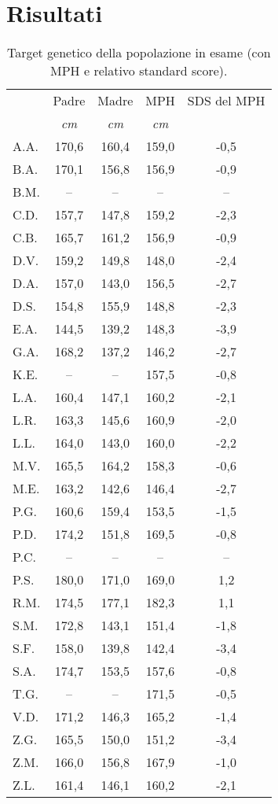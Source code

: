 \chapter{Risultati}

\begin{table}[!h]
\begin{center}
\addtolength{\tabcolsep}{12pt}
\renewcommand{\arraystretch}{1.1}
\begin{tabular}{lcccc}
\toprule

 & Padre & Madre & MPH & SDS del MPH \\
 & \emph{cm} & \emph{cm} & \emph{cm} & \\
\midrule
A.A.	& 170,6 & 160,4 & 159,0 & -0,5  \\
B.A.	& 170,1 & 156,8 & 156,9 & -0,9  \\
B.M.	& --    & --    & --    & --    \\
C.D.	& 157,7 & 147,8 & 159,2 & -2,3  \\
C.B.	& 165,7 & 161,2 & 156,9 & -0,9  \\
D.V.	& 159,2 & 149,8 & 148,0 & -2,4  \\
D.A.	& 157,0 & 143,0 & 156,5 & -2,7  \\
D.S.	& 154,8 & 155,9 & 148,8 & -2,3  \\
E.A.	& 144,5 & 139,2 & 148,3 & -3,9  \\
G.A.	& 168,2 & 137,2 & 146,2 & -2,7  \\
K.E.	&  --   &  --   & 157,5 & -0,8  \\            
L.A.	& 160,4 & 147,1 & 160,2 & -2,1  \\
L.R.	& 163,3 & 145,6 & 160,9 & -2,0  \\
L.L.	& 164,0 & 143,0 & 160,0 & -2,2  \\
M.V.	& 165,5 & 164,2 & 158,3 & -0,6  \\
M.E.	& 163,2 & 142,6 & 146,4 & -2,7  \\
P.G.	& 160,6 & 159,4 & 153,5 & -1,5  \\
P.D.	& 174,2 & 151,8 & 169,5 & -0,8  \\
P.C.	& --    & --    & --    & --    \\
P.S.	& 180,0 & 171,0 & 169,0 & 1,2   \\
R.M.	& 174,5 & 177,1 & 182,3 & 1,1   \\
S.M.	& 172,8 & 143,1 & 151,4 & -1,8  \\
S.F.	& 158,0 & 139,8 & 142,4 & -3,4  \\
S.A.	& 174,7 & 153,5 & 157,6 & -0,8  \\
T.G.    & --    & --    & 171,5 & -0,5  \\
V.D.	& 171,2 & 146,3 & 165,2 & -1,4  \\
Z.G.	& 165,5 & 150,0 & 151,2 & -3,4  \\
Z.M.	& 166,0 & 156,8 & 167,9 & -1,0  \\
Z.L.	& 161,4 & 146,1 & 160,2 & -2,1  \\
\bottomrule
\end{tabular}
\end{center}
\caption{Target genetico della popolazione in esame (con MPH e relativo standard score).}
\label{tab:TargetGenetici}
\end{table}

